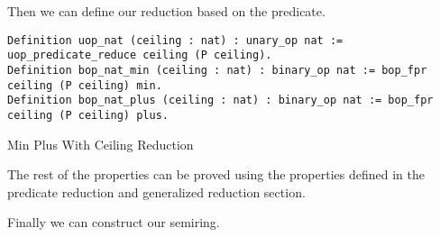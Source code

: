 Then we can define our reduction based on the predicate.
\begin{listing}[H]
\begin{verbatim}
Definition uop_nat (ceiling : nat) : unary_op nat := uop_predicate_reduce ceiling (P ceiling).
Definition bop_nat_min (ceiling : nat) : binary_op nat := bop_fpr ceiling (P ceiling) min.
Definition bop_nat_plus (ceiling : nat) : binary_op nat := bop_fpr ceiling (P ceiling) plus.
\end{verbatim}
\caption{Min Plus With Ceiling Reduction} 
\label{coq:def:min_plus_with_ceiling_reduction}
\end{listing}

The rest of the properties can be proved using the properties defined in the predicate reduction and generalized reduction section.

Finally we can construct our semiring.

